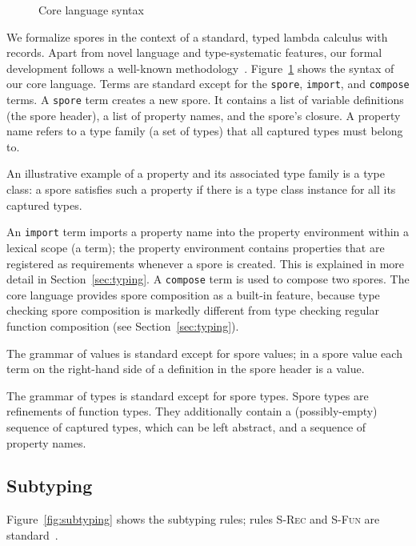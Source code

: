 \documentclass[runningheads]{llncs}
\begin{document}
\begin{sloppypar}
\begin{figure}[ht!]
  \vspace{1mm}
  \caption{Core language syntax}
  \label{fig:syntax}
  \vspace{1mm}
\end{figure}


We formalize spores in the context of a standard, typed lambda calculus with records. Apart from novel language and type-systematic features, our formal development follows a well-known methodology~\cite{TAPL}. Figure~\ref{fig:syntax} shows the syntax of our core language. Terms are standard except for the \texttt{spore}, \texttt{import}, and \texttt{compose} terms. A \texttt{spore} term creates a new spore. It contains a list of variable definitions (the spore header), a list of property names, and the spore's closure. A property name refers to a type family (a set of types) that all captured types must belong to.

An illustrative example of a property and its associated type family is a type class: a spore satisfies such a property if there is a type class instance for all its captured types.

An \texttt{import} term imports a property name into the property environment
within a lexical scope (a term); the property environment contains properties
that are registered as requirements whenever a spore is created. This is
explained in more detail in Section~\ref{sec:typing}. A \texttt{compose} term
is used to compose two spores. The core language provides spore composition as
a built-in feature, because type checking spore composition is markedly
different from type checking regular function composition (see
Section~\ref{sec:typing}).

The grammar of values is standard except for spore values; in a spore value each term on the right-hand side of a definition in the spore header is a value.

The grammar of types is standard except for spore types. Spore types are refinements of function types. They additionally contain a (possibly-empty) sequence of captured types, which can be left abstract, and a sequence of property names.

\subsection{Subtyping}\label{sec:subtyping}

Figure~\ref{fig:subtyping} shows the subtyping rules; rules \textsc{S-Rec} and \textsc{S-Fun} are standard~\cite{TAPL}.


\end{sloppypar}
\end{document}
